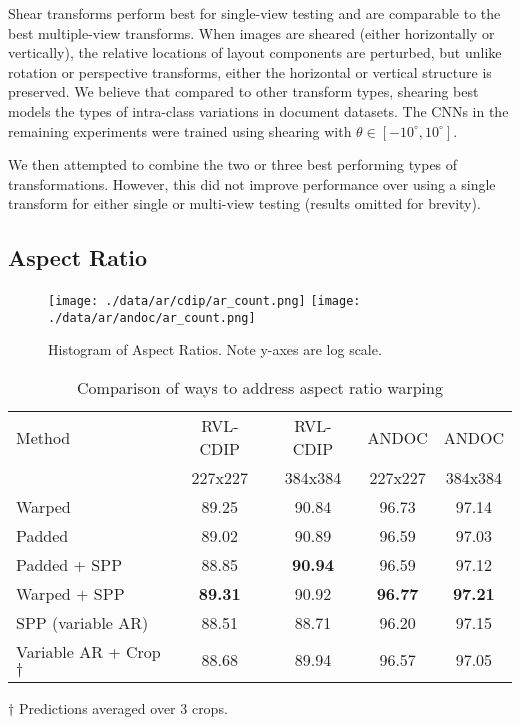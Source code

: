 \documentclass[10pt, conference, compsocconf]{IEEEtran}
\newcommand{\squeezeup}{\vspace{-2.5mm}}
\begin{document}
Shear transforms perform best for single-view testing and are comparable to the best multiple-view transforms.
When images are sheared (either horizontally or vertically), the relative locations of layout components are perturbed, but unlike rotation or perspective transforms, either the horizontal or vertical structure is preserved.
We believe that compared to other transform types, shearing best models the types of intra-class variations in document datasets.
The CNNs in the remaining experiments were trained using shearing with $\theta \in [-10^{\circ},10^{\circ}]$.

We then attempted to combine the two or three best performing types of transformations.
However, this did not improve performance over using a single transform for either single or multi-view testing (results omitted for brevity).


\subsection{Aspect Ratio}

\begin{figure}

\texttt{[image: ./data/ar/cdip/ar\_count.png]}
\texttt{[image: ./data/ar/andoc/ar\_count.png]}

\caption{Histogram of Aspect Ratios. Note y-axes are log scale.}
\label{fig:ar}
\end{figure}

\begin{table}
\begin{tabular}{l|c|c|c|c}

Method            & RVL-CDIP & RVL-CDIP & ANDOC   & ANDOC    \\
                  & 227x227  & 384x384  & 227x227 & 384x384  \\
\hline
Warped            &  89.25   &  90.84   & 96.73   & 97.14    \\
Padded            &  89.02   &  90.89   & 96.59   & 97.03    \\
Padded + SPP      &  88.85   &  \textbf{90.94}   & 96.59   & 97.12   \\
Warped  + SPP     &  \textbf{89.31}   & 90.92   & \textbf{96.77}   & \textbf{97.21}    \\
SPP (variable AR) &  88.51   &  88.71   & 96.20   & 97.15   \\
Variable AR + Crop$\dagger$ &  88.68   &  89.94   & 96.57   & 97.05    \\
\end{tabular}

$\dagger$ Predictions averaged over 3 crops.
\caption{Comparison of ways to address aspect ratio warping}
\label{tab:pad}
\squeezeup
\squeezeup
\end{table}
\end{document}

